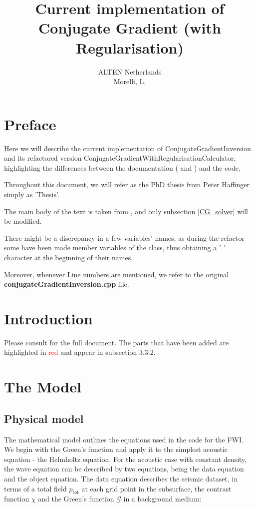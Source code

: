 \documentclass[10pt,a4paper]{article}
\title{Current implementation of Conjugate Gradient (with Regularisation)}
\author{ALTEN Netherlands\\
Morelli, L.}
\begin{document}
\maketitle
\newpage
\tableofcontents
\newpage

\clearpage
\section{Preface}
Here we will describe the current implementation of ConjugateGradientInversion and its refactored version ConjugateGradientWithRegularisationCalculator, highlighting the differences between the documentation ( \texttt{} and \newline \texttt{} ) and the code.

Throughout this document, we will refer as the PhD thesis from Peter Haffinger simply as 'Thesis'.

The main body of the text is taken from \texttt{}, and only subsection \ref{CG_solver} will be modified.

There might be a discrepancy in a few variables' names, as during the refactor some have been made member variables of the class, thus obtaining a $'\_'$ character at the beginning of their names.

Moreover, whenever Line numbers are mentioned, we refer to the original \textbf{conjugateGradientInversion.cpp} file.

\section{Introduction}
Please consult  \texttt{} for the full document. 
The parts that have been added are highlighted in \textcolor{red}{red} and appear in subsection 3.3.2.

\section{The Model}
\subsection{Physical model}

The mathematical model outlines the equations used in the code for the FWI.
We begin with the Green's function and apply it to the
simplest acoustic equation - the Helmholtz equation.
For the acoustic case with constant density, the wave equation can be
described by two equations,
being the data equation and the object equation. The data equation
describes the seismic dataset, in terms of a total field
$p_{\text{tot}}$ at each grid point in the subsurface, the contrast
function $\chi$ and the Green's function $\mathcal{G}$
in a background medium: 
\end{document}
